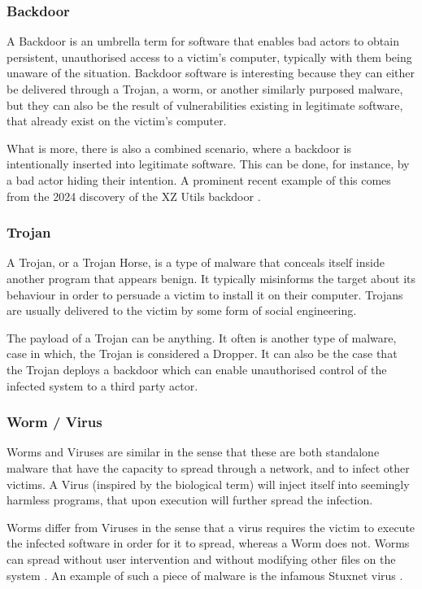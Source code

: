 \subsubsection{Backdoor}

A Backdoor is an umbrella term for software that enables bad actors to obtain persistent, unauthorised access to a victim's computer, typically with them being unaware of the situation. Backdoor software is  interesting because they can either be delivered through a Trojan, a worm, or another similarly purposed malware, but they can also be the result of vulnerabilities existing in legitimate software, that already exist on the victim's computer. 

What is more, there is also a combined scenario, where a backdoor is intentionally inserted into legitimate software. This can be done, for instance, by a bad actor hiding their intention. A prominent recent example of this comes from the 2024 discovery of the XZ Utils backdoor \cite{xz_backdoor}.

\subsubsection{Trojan}

A Trojan, or a Trojan Horse, is a type of malware that conceals itself inside another program that appears benign. It typically misinforms the target about its behaviour in order to persuade a victim to install it on their computer. Trojans are usually delivered to the victim by some form of social engineering. 

The payload of a Trojan can be anything. It often is another type of malware, case in which, the Trojan is considered a Dropper. It can also be the case that the Trojan deploys a backdoor which can enable unauthorised control of the infected system to a third party actor.

\subsubsection{Worm / Virus}

Worms and Viruses are similar in the sense that these are both standalone malware that have the capacity to spread through a network, and to infect other victims. A Virus (inspired by the biological term) will inject itself into seemingly harmless programs, that upon execution will further spread the infection. 

Worms differ from Viruses in the sense that a virus requires the victim to execute the infected software in order for it to spread, whereas a Worm does not. Worms can spread without user intervention and without modifying other files on the system \cite{wiki_malware}. An example of such a piece of malware is the infamous Stuxnet virus \cite{stuxnet}.

